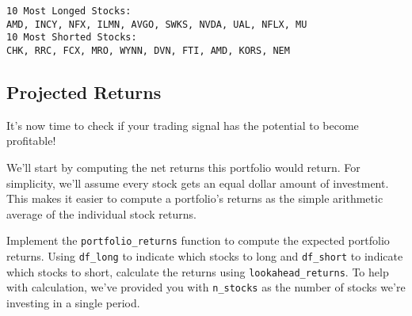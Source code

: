 \documentclass[11pt]{article}
\begin{document}
    \begin{Verbatim}[commandchars=\\\{\}]
10 Most Longed Stocks:
AMD, INCY, NFX, ILMN, AVGO, SWKS, NVDA, UAL, NFLX, MU
10 Most Shorted Stocks:
CHK, RRC, FCX, MRO, WYNN, DVN, FTI, AMD, KORS, NEM

    \end{Verbatim}

    \subsection{Projected Returns}\label{projected-returns}

It's now time to check if your trading signal has the potential to
become profitable!

We'll start by computing the net returns this portfolio would return.
For simplicity, we'll assume every stock gets an equal dollar amount of
investment. This makes it easier to compute a portfolio's returns as the
simple arithmetic average of the individual stock returns.

Implement the \texttt{portfolio\_returns} function to compute the
expected portfolio returns. Using \texttt{df\_long} to indicate which
stocks to long and \texttt{df\_short} to indicate which stocks to short,
calculate the returns using \texttt{lookahead\_returns}. To help with
calculation, we've provided you with \texttt{n\_stocks} as the number of
stocks we're investing in a single period.
\end{document}
